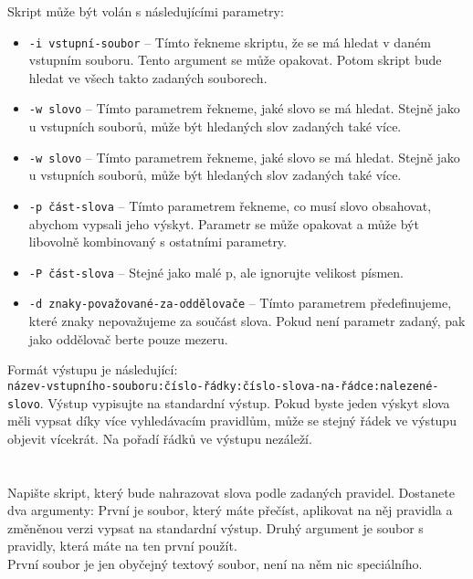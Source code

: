 \documentclass{scrartcl}
\begin{document}
        Skript může být volán s následujícími parametry:
        \begin{itemize}
                \item \texttt{-i vstupní-soubor} -- Tímto řekneme skriptu, že se má hledat v daném vstupním souboru. Tento argument se může opakovat. Potom skript bude hledat ve všech takto zadaných souborech. 
                \item  \texttt{-w slovo} -- Tímto parametrem řekneme, jaké slovo se má hledat. Stejně jako u vstupních souborů, může být hledaných slov zadaných také více. 
                \item  \texttt{-w slovo} -- Tímto parametrem řekneme, jaké slovo se má hledat. Stejně jako u vstupních souborů, může být hledaných slov zadaných také více. 
                \item  \texttt{-p část-slova} -- Tímto parametrem řekneme, co musí slovo obsahovat, abychom vypsali jeho výskyt. Parametr se může opakovat a může být libovolně kombinovaný s ostatními parametry. 
                \item  \texttt{-P část-slova} -- Stejné jako malé p, ale ignorujte velikost písmen. 
                \item  \texttt{-d znaky-považované-za-oddělovače} -- Tímto parametrem předefinujeme, které znaky nepovažujeme za součást slova. Pokud není parametr zadaný, pak jako oddělovač berte pouze mezeru. 
        \end{itemize}

        Formát výstupu je následující:\\
        \texttt{název-vstupního-souboru:číslo-řádky:číslo-slova-na-řádce:nalezené-slovo}. Výstup vypisujte na standardní výstup. Pokud byste jeden výskyt slova měli vypsat díky více vyhledávacím pravidlům, může se stejný řádek ve výstupu objevit vícekrát. Na pořadí řádků ve výstupu nezáleží. 

        \section{}
        Napište skript, který bude nahrazovat slova podle zadaných pravidel. Dostanete dva argumenty: První je soubor, který máte přečíst, aplikovat na něj pravidla a změněnou verzi vypsat na standardní výstup. Druhý argument je soubor s pravidly, která máte na ten první použít.\\

        První soubor je jen obyčejný textový soubor, není na něm nic speciálního.\\
\end{document}
